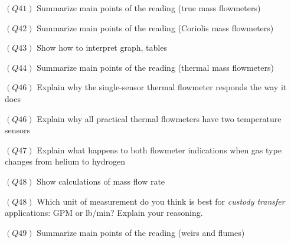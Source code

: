 \medskip
\item{$(Q41)$} Summarize main points of the reading (true mass flowmeters)
\item{$(Q42)$} Summarize main points of the reading (Coriolis mass flowmeters)
\item{$(Q43)$} Show how to interpret graph, tables
\item{$(Q44)$} Summarize main points of the reading (thermal mass flowmeters)
\item{$(Q46)$} Explain why the single-sensor thermal flowmeter responds the way it does
\item{$(Q46)$} Explain why all practical thermal flowmeters have two temperature sensors
\item{$(Q47)$} Explain what happens to both flowmeter indications when gas type changes from helium to hydrogen
\item{$(Q48)$} Show calculations of mass flow rate
\item{$(Q48)$} Which unit of measurement do you think is best for {\it custody transfer} applications: GPM or lb/min?  Explain your reasoning.
\item{$(Q49)$} Summarize main points of the reading (weirs and flumes)
\medskip

